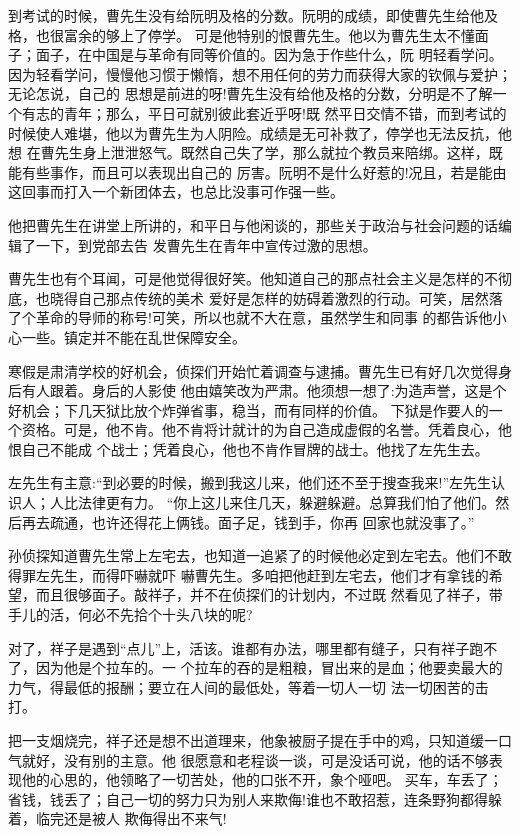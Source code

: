 \documentclass[11pt,a4paper,onecolumn]{article}
\begin{document}
到考试的时候，曹先生没有给阮明及格的分数。阮明的成绩，即使曹先生给他及格，也很富余的够上了停学。
可是他特别的恨曹先生。他以为曹先生太不懂面子；面子，在中国是与革命有同等价值的。因为急于作些什么，阮
明轻看学问。因为轻看学问，慢慢他习惯于懒惰，想不用任何的劳力而获得大家的钦佩与爱护；无论怎说，自己的
思想是前进的呀!曹先生没有给他及格的分数，分明是不了解一个有志的青年；那么，平日可就别彼此套近乎呀!既
然平日交情不错，而到考试的时候使人难堪，他以为曹先生为人阴险。成绩是无可补救了，停学也无法反抗，他想
在曹先生身上泄泄怒气。既然自己失了学，那么就拉个教员来陪绑。这样，既能有些事作，而且可以表现出自己的
厉害。阮明不是什么好惹的!况且，若是能由这回事而打入一个新团体去，也总比没事可作强一些。

他把曹先生在讲堂上所讲的，和平日与他闲谈的，那些关于政治与社会问题的话编辑了一下，到党部去告
发\myrule 曹先生在青年中宣传过激的思想。

曹先生也有个耳闻，可是他觉得很好笑。他知道自己的那点社会主义是怎样的不彻底，也晓得自己那点传统的美术
爱好是怎样的妨碍着激烈的行动。可笑，居然落了个革命的导师的称号!可笑，所以也就不大在意，虽然学生和同事
的都告诉他小心一些。镇定并不能\myrule 在乱世\myrule 保障安全。

寒假是肃清学校的好机会，侦探们开始忙着调查与逮捕。曹先生已有好几次觉得身后有人跟着。身后的人影使
他由嬉笑改为严肃。他须想一想了:为造声誉，这是个好机会；下几天狱比放个炸弹省事，稳当，而有同样的价值。
下狱是作要人的一个资格。可是，他不肯。他不肯将计就计的为自己造成虚假的名誉。凭着良心，他恨自己不能成
个战士；凭着良心，他也不肯作冒牌的战士。他找了左先生去。

左先生有主意:``到必要的时候，搬到我这儿来，他们还不至于搜查我来!''左先生认识人；人比法律更有力。
``你上这儿来住几天，躲避躲避。总算我们怕了他们。然后再去疏通，也许还得花上俩钱。面子足，钱到手，你再
回家也就没事了。''

孙侦探知道曹先生常上左宅去，也知道一追紧了的时候他必定到左宅去。他们不敢得罪左先生，而得吓嚇就吓
嚇曹先生。多咱把他赶到左宅去，他们才有拿钱的希望，而且很够面子。敲祥子，并不在侦探们的计划内，不过既
然看见了祥子，带手儿的活，何必不先拾个十头八块的呢?

对了，祥子是遇到``点儿''上，活该。谁都有办法，哪里都有缝子，只有祥子跑不了，因为他是个拉车的。一
个拉车的吞的是粗粮，冒出来的是血；他要卖最大的力气，得最低的报酬；要立在人间的最低处，等着一切人一切
法一切困苦的击打。

把一支烟烧完，祥子还是想不出道理来，他象被厨子提在手中的鸡，只知道缓一口气就好，没有别的主意。他
很愿意和老程谈一谈，可是没话可说，他的话不够表现他的心思的，他领略了一切苦处，他的口张不开，象个哑吧。
买车，车丢了；省钱，钱丢了；自己一切的努力只为别人来欺侮!谁也不敢招惹，连条野狗都得躲着，临完还是被人
欺侮得出不来气!
\end{document}
